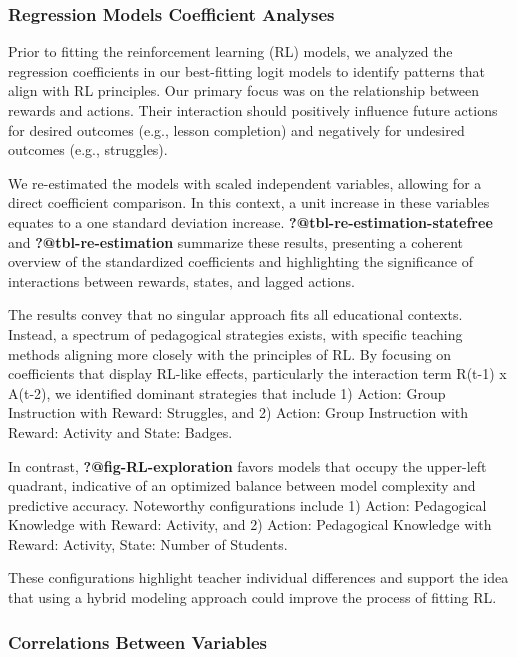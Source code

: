 \documentclass[
  number,
  preprint,
  3p,
  onecolumn]{elsarticle}
\begin{document}
\subsubsection{Regression Models Coefficient
Analyses}\label{regression-models-coefficient-analyses}

Prior to fitting the reinforcement learning (RL) models, we analyzed the
regression coefficients in our best-fitting logit models to identify
patterns that align with RL principles. Our primary focus was on the
relationship between rewards and actions. Their interaction should
positively influence future actions for desired outcomes (e.g., lesson
completion) and negatively for undesired outcomes (e.g., struggles).

We re-estimated the models with scaled independent variables, allowing
for a direct coefficient comparison. In this context, a unit increase in
these variables equates to a one standard deviation increase.
\textbf{?@tbl-re-estimation-statefree} and \textbf{?@tbl-re-estimation}
summarize these results, presenting a coherent overview of the
standardized coefficients and highlighting the significance of
interactions between rewards, states, and lagged actions.

The results convey that no singular approach fits all educational
contexts. Instead, a spectrum of pedagogical strategies exists, with
specific teaching methods aligning more closely with the principles of
RL. By focusing on coefficients that display RL-like effects,
particularly the interaction term R(t-1) x A(t-2), we identified
dominant strategies that include 1) Action: Group Instruction with
Reward: Struggles, and 2) Action: Group Instruction with Reward:
Activity and State: Badges.

In contrast, \textbf{?@fig-RL-exploration} favors models that occupy the
upper-left quadrant, indicative of an optimized balance between model
complexity and predictive accuracy. Noteworthy configurations include 1)
Action: Pedagogical Knowledge with Reward: Activity, and 2) Action:
Pedagogical Knowledge with Reward: Activity, State: Number of Students.

These configurations highlight teacher individual differences and
support the idea that using a hybrid modeling approach could improve the
process of fitting RL.

\subsubsection{Correlations Between
Variables}\label{correlations-between-variables}
\end{document}
